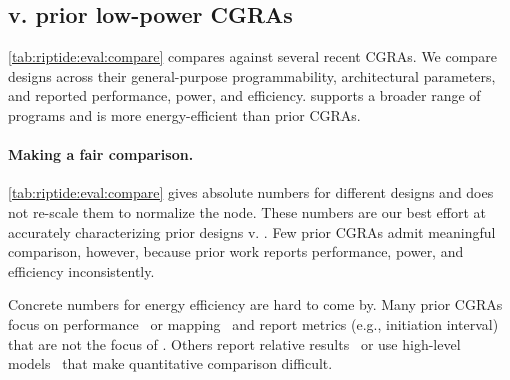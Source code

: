 \subsection{\riptide v. prior low-power CGRAs}
\label{sec:eval:compare}
\autoref{tab:riptide:eval:compare} compares \riptide against several recent CGRAs.
% 
We compare designs across their general-purpose programmability, architectural parameters, and reported performance, power, and efficiency.
% 
\riptide supports a broader range of programs and is more energy-efficient than prior CGRAs.
%

\paragraph{Making a fair comparison.}
\autoref{tab:riptide:eval:compare} gives absolute numbers for different designs and does not re-scale them to normalize the node.
% 
These numbers are our best effort at accurately characterizing prior designs v. \riptide.
%
Few prior CGRAs admit meaningful comparison, however, because prior work reports performance, power, and efficiency inconsistently.

Concrete numbers for energy efficiency are hard to come by.
%
Many prior CGRAs focus on performance~\cite{plasticine,voitsechov2014single} or mapping~\cite{4dcgra,lee2021ultra,himap} and report metrics (e.g., initiation interval) that are not the focus of \riptide.
% 
Others report relative results~\cite{torng2021ultra,nguyen2021fifer} or use high-level models~\cite{weng2020hybrid,nguyen2021fifer} that make quantitative comparison difficult.
%

